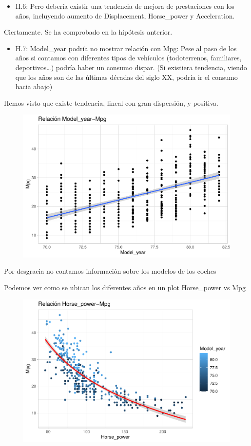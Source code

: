 \begin{itemize}
\item H.6: Pero debería existir una tendencia de mejora de prestaciones con los años, incluyendo aumento de Displacement, Horse\_power y Acceleration.
\end{itemize}

Ciertamente. Se ha comprobado en la hipótesis anterior.

\begin{itemize}
\item H.7: Model\_year podría no mostrar relación con Mpg: Pese al paso de los años si contamos con diferentes tipos de vehículos (todoterrenos, familiares, deportivos\ldots) podría haber un consumo dispar. (Si existiera tendencia, viendo que los años son de las últimas décadas
  del siglo XX, podría ir el consumo hacia abajo)
\end{itemize}

Hemos visto que existe tendencia, lineal con gran dispersión, y
positiva.

\begin{figure}[H]\includegraphics[width=.9\linewidth]{img/EDA_files/figure-latex/unnamed-chunk-32-1} \caption{}\end{figure}

Por desgracia no contamos información sobre los modelos de los coches

Podemos ver como se ubican los diferentes años en un plot Horse\_power vs Mpg

\begin{figure}[H]\includegraphics[width=.9\linewidth]{img/EDA_files/figure-latex/unnamed-chunk-33-1} \caption{}\end{figure}

